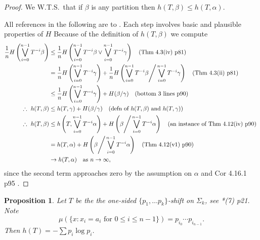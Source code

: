 \documentclass[a4paper]{amsart}
\theoremstyle{plain}
\newtheorem{proposition}[theorem]{Proposition}
\theoremstyle{definition}
\theoremstyle{remark}
\begin{document}
\begin{proof} We W.T.S.\ that if $ \beta $ is any partition then $ h(T, \beta ) \leq h(T, \alpha ) $.  

All references in the following are to \cite{Wal}.   Each step involves basic and plausible properties of $ H $ 
Because of the definition of $h (T, \beta ) $ we compute
\begin{align*}
\frac{1}{n} H\left( \bigvee_{i=0}^{n-1} T^{-i} \beta \right)
   &\leq  \frac{1}{n} H\left( \bigvee_{i=0}^{n-1} T^{-i} \beta \vee    \bigvee_{i=0}^{n-1} T^{-i} \gamma    \right)
   \quad \text{(Thm 4.3(iv) p81)}   \\
   &= \frac{1}{n}  H\left(  \bigvee_{i=0}^{n-1} T^{-i} \gamma  \right) +  
    \frac{1}{n} H\left( \bigvee_{i=0}^{n-1} T^{-i} \beta \Bigg/    \bigvee_{i=0}^{n-1} T^{-i} \gamma    \right)
   \quad \text{(Thm 4.3(ii) p81)}   \\
   &\leq \frac{1}{n}  H\left(  \bigvee_{i=0}^{n-1} T^{-i} \gamma  \right) +  H(\beta / \gamma ) 
   \quad \text{(bottom 3 lines p90)}   \\
\therefore\ h(T, \beta ) &\leq    h(T, \gamma  ) +  H(\beta / \gamma ) 
    \quad \text{(defn of $h(T, \beta ) $ and $     h(T, \gamma  ) $) }   \\
\therefore\ h(T, \beta ) &\leq    h\left(T,   \bigvee_{i=0}^{n-1} T^{-i} \alpha   \right) + 
                 H\left(\beta \Bigg/   \bigvee_{i=0}^{n-1} T^{-i} \alpha   \right)  
    \quad \text{(an instance of Thm 4.12(iv) p90) }   \\
    &= h(T, \alpha) +        H\left(\beta \Bigg/   \bigvee_{i=0}^{n-1} T^{-i} \alpha   \right)           
    \quad \text{(Thm 4.12(v1) p90) }   \\
        &\to     h(T, \alpha) \quad \text{as } n\to \infty,
  \end{align*} 
since the second term approaches zero by the assumption on $ \alpha  $ and Cor 4.16.1 p95 .               
\end{proof} 


\begin{proposition} Let $ T $ be the the one-sided $\{p_1,\dots p_k\} $-shift  on $ \Sigma_k $, see \cite{Wal}*{(7) p21}.  Note
\[
 \mu(\{x : x_i = a_i \text{ for } 0\leq i \leq n-1 \}) = p_{i_0} \cdots  p_{i_{n-1}}.
 \]
 Then $ h(T) =-\sum p_i \log p_i $.
\end{proposition}
\end{document}
